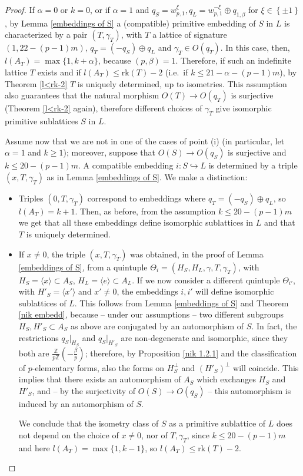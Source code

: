 \documentclass{amsart}
\theoremstyle{definition}
\newcommand{\ra}{\rightarrow}
\newcommand{\IZ}{\mathbb{Z}}
\newcommand{\rk}{\mathrm{rk}}
\begin{document}
\begin{proof}
If $\alpha = 0$ or $k=0$, or if $\alpha = 1$ and $q_S =w^{\xi}_{p,1}, q_L=w^{-\xi}_{p,1} \oplus q_{1, \beta}$ for $\xi \in \left\{ \pm 1\right\}$, by Lemma \ref{embeddings of S} a (compatible) primitive embedding of $S$ in $L$ is characterized by a pair $(T, \gamma_T)$, with $T$ a lattice of signature $(1, 22 - (p-1)m)$, $q_T = (-q_S)\oplus q_L$ and $\gamma_T \in O(q_T)$. In this case, then, $l(A_T) = \max\{1, k + \alpha\}$, because $(p, \beta) = 1$. Therefore, if such an indefinite lattice $T$ exists and if $l(A_T) \leq \rk(T)-2$ (i.e.\ if $k \leq 21 - \alpha - (p-1)m$), by Theorem \ref{l<rk-2} $T$ is uniquely determined, up to isometries. This assumption also guarantees that the natural morphism $O(T) \ra O(q_T)$ is surjective (Theorem \ref{l<rk-2} again), therefore different choices of $\gamma_T$ give isomorphic primitive sublattices $S$ in $L$.

Assume now that we are not in one of the cases of point (i) (in particular, let $\alpha = 1$ and $k \geq 1$); moreover, suppose that $O(S) \ra O(q_S)$ is surjective and $k \leq 20 - (p-1)m$. A compatible embedding $i: S \hookrightarrow L$ is determined by a triple $(x, T, \gamma_T)$ as in Lemma \ref{embeddings of S}. We make a distinction:
\begin{itemize}
\item Triples $(0,T,\gamma_T)$ correspond to embeddings where $q_T = (-q_S)\oplus q_L$, so $l(A_T) = k + 1$. Then, as before, from the assumption $k \leq 20 - (p-1)m$ we get that all these embeddings define isomorphic sublattices in $L$ and that $T$ is uniquely determined.
\item If $x \neq 0$, the triple $(x, T, \gamma_T)$ was obtained, in the proof of Lemma \ref{embeddings of S}, from a quintuple $\Theta_i = (H_S, H_L, \gamma, T, \gamma_T)$, with $H_S = \langle x \rangle \subset A_S$, $H_L = \langle e \rangle \subset A_L$. If we now consider a different quintuple $\Theta_{i'}$, with $H'_S = \langle x' \rangle$ and $x' \neq 0$, the embeddings $i, i'$ will define isomorphic sublattices of $L$. This follows from Lemma \ref{embeddings of S} and Theorem \ref{nik embedd}, because -- under our assumptions -- two different subgroups $H_S, H'_S \subset A_S$ as above are conjugated by an automorphism of $S$. In fact, the restrictions $q_S\vert_{H_S}$ and $q_S\vert_{H'_S}$ are non-degenerate and isomorphic, since they both are $\frac{\IZ}{p \IZ} \left( -\frac{\beta}{p}\right)$; therefore, by Proposition \ref{nik 1.2.1} and the classification of $p$-elementary forms, also the forms on $H_S^\perp$ and $(H'_S)^\perp$ will coincide. This implies that there exists an automorphism of $A_S$ which exchanges $H_S$ and $H'_S$, and -- by the surjectivity of $O(S) \ra O(q_S)$ -- this automorphism is induced by an automorphism of $S$.

We conclude that the isometry class of $S$ as a primitive sublattice of $L$ does not depend on the choice of $x \neq 0$, nor of $T, \gamma_T$, since $k \leq 20 - (p-1)m$ and here $l(A_T) = \max\{1, k -1\}$, so $l(A_T) \leq \rk(T)-2$. \qedhere
\end{itemize} 
\end{proof}
\end{document}
